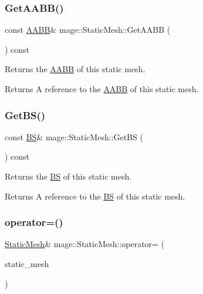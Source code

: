 \subsubsection{\texorpdfstring{Get\+A\+A\+B\+B()}{GetAABB()}}
{\footnotesize\ttfamily const \hyperlink{structmage_1_1_a_a_b_b}{A\+A\+BB}\& mage\+::\+Static\+Mesh\+::\+Get\+A\+A\+BB (\begin{DoxyParamCaption}{ }\end{DoxyParamCaption}) const\hspace{0.3cm}{\ttfamily [noexcept]}}

Returns the \hyperlink{structmage_1_1_a_a_b_b}{A\+A\+BB} of this static mesh.

\begin{DoxyReturn}{Returns}
A reference to the \hyperlink{structmage_1_1_a_a_b_b}{A\+A\+BB} of this static mesh. 
\end{DoxyReturn}
\hypertarget{classmage_1_1_static_mesh_a007a31e6630f5095af7f1e468f12912f}{}\label{classmage_1_1_static_mesh_a007a31e6630f5095af7f1e468f12912f} 
\subsubsection{\texorpdfstring{Get\+B\+S()}{GetBS()}}
{\footnotesize\ttfamily const \hyperlink{structmage_1_1_b_s}{BS}\& mage\+::\+Static\+Mesh\+::\+Get\+BS (\begin{DoxyParamCaption}{ }\end{DoxyParamCaption}) const\hspace{0.3cm}{\ttfamily [noexcept]}}

Returns the \hyperlink{structmage_1_1_b_s}{BS} of this static mesh.

\begin{DoxyReturn}{Returns}
A reference to the \hyperlink{structmage_1_1_b_s}{BS} of this static mesh. 
\end{DoxyReturn}
\hypertarget{classmage_1_1_static_mesh_af73dd102f2de9cf7529e380895cfc8ff}{}\label{classmage_1_1_static_mesh_af73dd102f2de9cf7529e380895cfc8ff} 
\subsubsection{\texorpdfstring{operator=()}{operator=()}\hspace{0.1cm}{\footnotesize\ttfamily [1/2]}}
{\footnotesize\ttfamily \hyperlink{classmage_1_1_static_mesh}{Static\+Mesh}\& mage\+::\+Static\+Mesh\+::operator= (\begin{DoxyParamCaption}\item[{const \hyperlink{classmage_1_1_static_mesh}{Static\+Mesh} \&}]{static\+\_\+mesh }\end{DoxyParamCaption})\hspace{0.3cm}{\ttfamily [delete]}}


